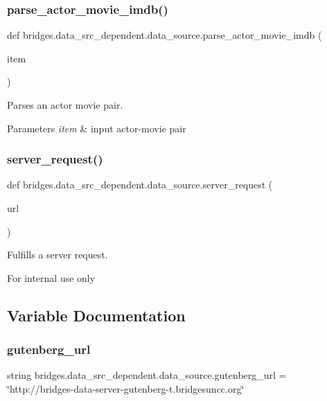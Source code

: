 \subsubsection{\texorpdfstring{parse\+\_\+actor\+\_\+movie\+\_\+imdb()}{parse\_actor\_movie\_imdb()}}
{\footnotesize\ttfamily def bridges.\+data\+\_\+src\+\_\+dependent.\+data\+\_\+source.\+parse\+\_\+actor\+\_\+movie\+\_\+imdb (\begin{DoxyParamCaption}\item[{}]{item }\end{DoxyParamCaption})}



Parses an actor movie pair. 


\begin{DoxyParams}{Parameters}
{\em item} & input actor-\/movie pair \\
\hline
\end{DoxyParams}
\mbox{\label{namespacebridges_1_1data__src__dependent_1_1data__source_a1b4461e2564ec55001104bd9bf45e252}} 
\subsubsection{\texorpdfstring{server\+\_\+request()}{server\_request()}}
{\footnotesize\ttfamily def bridges.\+data\+\_\+src\+\_\+dependent.\+data\+\_\+source.\+server\+\_\+request (\begin{DoxyParamCaption}\item[{}]{url }\end{DoxyParamCaption})}



Fulfills a server request. 

For internal use only 

\subsection{Variable Documentation}
\mbox{\label{namespacebridges_1_1data__src__dependent_1_1data__source_ac96761b5dd36368bdf11b7fee35c88a8}} 
\subsubsection{\texorpdfstring{gutenberg\+\_\+url}{gutenberg\_url}}
{\footnotesize\ttfamily string bridges.\+data\+\_\+src\+\_\+dependent.\+data\+\_\+source.\+gutenberg\+\_\+url = \char`\"{}http\+://bridges-\/data-\/server-\/gutenberg-\/t.\+bridgesuncc.\+org\char`\"{}}

